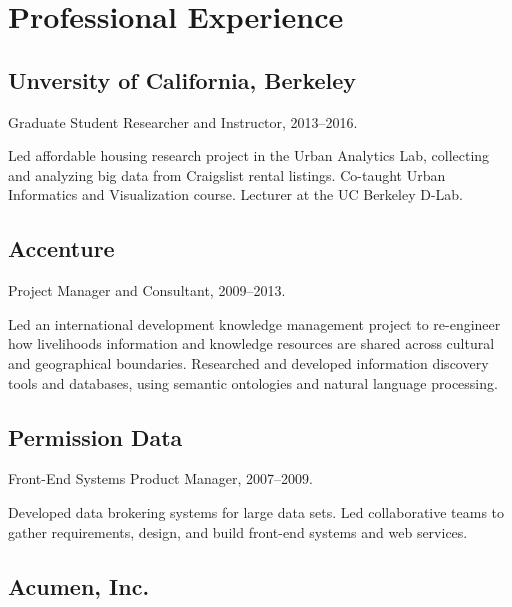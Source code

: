 \documentclass[11pt,letterpaper]{report}
\renewenvironment{itemize}{
  \begin{list}{}{
      \setlength{\leftmargin}{1.75em}
      \setlength{\itemsep}{0.25em}
      \setlength{\parskip}{0em}
      \setlength{\parsep}{0.25em}
    }
}{
  \end{list}
}
\begin{document}
\section*{Professional Experience}

\subsection*{Unversity of California, Berkeley}

\begin{itemize}
\item Graduate Student Researcher and Instructor, 2013--2016.
\item Led affordable housing research project in the Urban Analytics Lab, collecting and analyzing big data from Craigslist rental listings. Co-taught Urban Informatics and Visualization course. Lecturer at the UC Berkeley D-Lab.
\end{itemize}

\subsection*{Accenture}
  
\begin{itemize}
\item Project Manager and Consultant, 2009--2013.
\item Led an international development knowledge management project to re-engineer how livelihoods information and knowledge resources are shared across cultural and geographical boundaries. Researched and developed information discovery tools and databases, using semantic ontologies and natural language processing.
\end{itemize}

\subsection*{Permission Data}
  
\begin{itemize}
\item Front-End Systems Product Manager, 2007--2009.
\item Developed data brokering systems for large data sets. Led collaborative teams to gather requirements, design, and build front-end systems and web services.
\end{itemize}

\subsection*{Acumen, Inc.}
  
\end{document}
